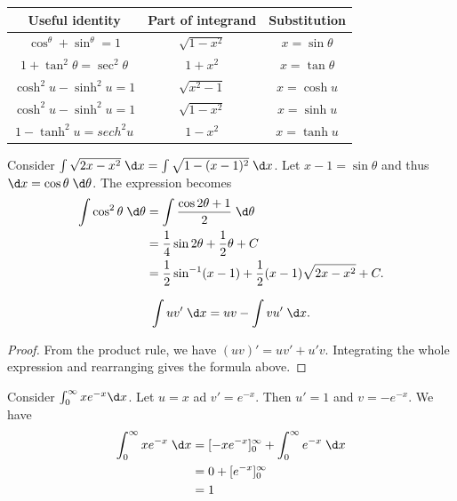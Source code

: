\documentclass[a4paper]{article}
\begin{document}
\vspace{4pt}
\noindent
\begin{tabular}{ccc}
\toprule
Useful identity                   & Part of integrand & Substitution      \\
\midrule
$\cos^\theta + \sin^\theta = 1$   & $\sqrt{1 - x^2}$  & $x = \sin \theta$ \\
$1 + \tan^2\theta = \sec^2\theta$ & $1 + x^2$         & $x = \tan\theta$  \\
$\cosh^2u - \sinh^2 u = 1$        & $\sqrt{x^2 - 1}$  & $x=\cosh u$       \\
$\cosh^2u - \sinh^2 u = 1$        & $\sqrt{1 - x^2}$  & $x=\sinh u$       \\
$1 - \tanh^2 u = sech^2u$         & $1 - x^2$         & $x = \tanh u$     \\
\bottomrule
\end{tabular}

\begin{eg}
  Consider $\int \sqrt{2x - x^2}\;\d x = \int\sqrt{1 - (x - 1)^2}\;\d x$. Let $x - 1=\sin\theta$ and thus $\d x = \cos \theta\;\d\theta$. The expression becomes
  \begin{align*}
    \int \cos^2\theta \;\d \theta &= \int\frac{\cos 2\theta + 1}{2}\;\d \theta\\
    &= \frac{1}{4}\sin 2\theta + \frac{1}{2}\theta + C\\
    &= \frac{1}{2}\sin^{-1}(x - 1) + \frac{1}{2}(x - 1)\sqrt{2x - x^2} + C.
  \end{align*}
\end{eg}

\begin{thm}
  \[
  \int uv'\;\d x = uv - \int vu' \;\d x.
  \]
\end{thm}

\begin{proof}
  From the product rule, we have $(uv)' = uv' + u'v$. Integrating the whole expression and rearranging gives the formula above.
\end{proof}

\begin{eg}
  Consider $\int_0^\infty xe^{-x}\d x$. Let $u = x$ ad $v' = e^{-x}$. Then $u' = 1$ and $v = -e^{-x}$. We have
  \begin{align*}
    \int_0^\infty xe^{-x}\;\d x &= [-xe^{-x}]^\infty_0 + \int_0^\infty e^{-x} \;\d x\\
    &= 0 + [e^{-x}]_0^\infty\\
    &= 1
  \end{align*}
\end{eg}
\end{document}
